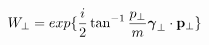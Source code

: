 \begin{equation}
W_{\perp} =exp \{ \frac{i}{2} \tan^{-1} \frac{p_{\perp}}{m} \mbox{\boldmath 
$\gamma$}_{\perp} \cdot {\bf p}_{\perp} \} 
\end{equation}

